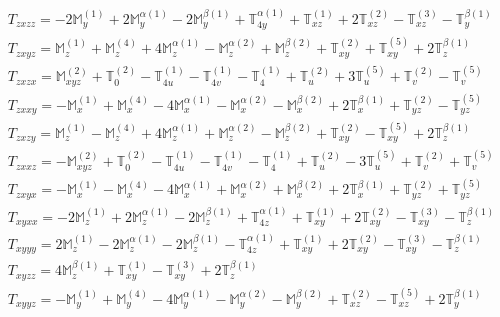\documentclass[fleqn,8pt,landscape]{jsarticle}
\begin{document}
\begin{align*}
& T_{zxzz} = - 2 \mathbb{M}_{y}^{(1)} + 2 \mathbb{M}_{y}^{\alpha(1)} - 2 \mathbb{M}_{y}^{\beta(1)} + \mathbb{T}_{4y}^{\alpha(1)} + \mathbb{T}_{xz}^{(1)} + 2 \mathbb{T}_{xz}^{(2)} - \mathbb{T}_{xz}^{(3)} - \mathbb{T}_{y}^{\beta(1)} \\
& T_{zxyz} = \mathbb{M}_{z}^{(1)} + \mathbb{M}_{z}^{(4)} + 4 \mathbb{M}_{z}^{\alpha(1)} - \mathbb{M}_{z}^{\alpha(2)} + \mathbb{M}_{z}^{\beta(2)} + \mathbb{T}_{xy}^{(2)} + \mathbb{T}_{xy}^{(5)} + 2 \mathbb{T}_{z}^{\beta(1)} \\
& T_{zxzx} = \mathbb{M}_{xyz}^{(2)} + \mathbb{T}_{0}^{(2)} - \mathbb{T}_{4u}^{(1)} - \mathbb{T}_{4v}^{(1)} - \mathbb{T}_{4}^{(1)} + \mathbb{T}_{u}^{(2)} + 3 \mathbb{T}_{u}^{(5)} + \mathbb{T}_{v}^{(2)} - \mathbb{T}_{v}^{(5)} \\
& T_{zxxy} = - \mathbb{M}_{x}^{(1)} + \mathbb{M}_{x}^{(4)} - 4 \mathbb{M}_{x}^{\alpha(1)} - \mathbb{M}_{x}^{\alpha(2)} - \mathbb{M}_{x}^{\beta(2)} + 2 \mathbb{T}_{x}^{\beta(1)} + \mathbb{T}_{yz}^{(2)} - \mathbb{T}_{yz}^{(5)} \\
& T_{zxzy} = \mathbb{M}_{z}^{(1)} - \mathbb{M}_{z}^{(4)} + 4 \mathbb{M}_{z}^{\alpha(1)} + \mathbb{M}_{z}^{\alpha(2)} - \mathbb{M}_{z}^{\beta(2)} + \mathbb{T}_{xy}^{(2)} - \mathbb{T}_{xy}^{(5)} + 2 \mathbb{T}_{z}^{\beta(1)} \\
& T_{zxxz} = - \mathbb{M}_{xyz}^{(2)} + \mathbb{T}_{0}^{(2)} - \mathbb{T}_{4u}^{(1)} - \mathbb{T}_{4v}^{(1)} - \mathbb{T}_{4}^{(1)} + \mathbb{T}_{u}^{(2)} - 3 \mathbb{T}_{u}^{(5)} + \mathbb{T}_{v}^{(2)} + \mathbb{T}_{v}^{(5)} \\
& T_{zxyx} = - \mathbb{M}_{x}^{(1)} - \mathbb{M}_{x}^{(4)} - 4 \mathbb{M}_{x}^{\alpha(1)} + \mathbb{M}_{x}^{\alpha(2)} + \mathbb{M}_{x}^{\beta(2)} + 2 \mathbb{T}_{x}^{\beta(1)} + \mathbb{T}_{yz}^{(2)} + \mathbb{T}_{yz}^{(5)} \\
& T_{xyxx} = - 2 \mathbb{M}_{z}^{(1)} + 2 \mathbb{M}_{z}^{\alpha(1)} - 2 \mathbb{M}_{z}^{\beta(1)} + \mathbb{T}_{4z}^{\alpha(1)} + \mathbb{T}_{xy}^{(1)} + 2 \mathbb{T}_{xy}^{(2)} - \mathbb{T}_{xy}^{(3)} - \mathbb{T}_{z}^{\beta(1)} \\
& T_{xyyy} = 2 \mathbb{M}_{z}^{(1)} - 2 \mathbb{M}_{z}^{\alpha(1)} - 2 \mathbb{M}_{z}^{\beta(1)} - \mathbb{T}_{4z}^{\alpha(1)} + \mathbb{T}_{xy}^{(1)} + 2 \mathbb{T}_{xy}^{(2)} - \mathbb{T}_{xy}^{(3)} - \mathbb{T}_{z}^{\beta(1)} \\
& T_{xyzz} = 4 \mathbb{M}_{z}^{\beta(1)} + \mathbb{T}_{xy}^{(1)} - \mathbb{T}_{xy}^{(3)} + 2 \mathbb{T}_{z}^{\beta(1)} \\
& T_{xyyz} = - \mathbb{M}_{y}^{(1)} + \mathbb{M}_{y}^{(4)} - 4 \mathbb{M}_{y}^{\alpha(1)} - \mathbb{M}_{y}^{\alpha(2)} - \mathbb{M}_{y}^{\beta(2)} + \mathbb{T}_{xz}^{(2)} - \mathbb{T}_{xz}^{(5)} + 2 \mathbb{T}_{y}^{\beta(1)} \\

\end{align*}
\end{document}
